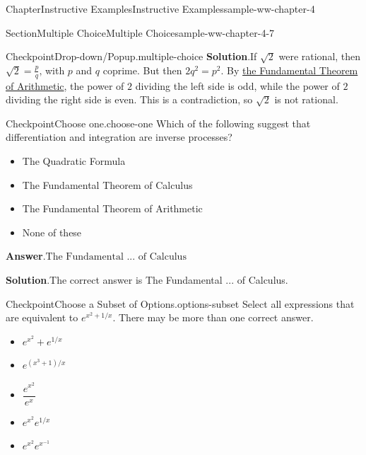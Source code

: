 \documentclass[oneside,10pt,]{book}
\newcommand{\blocktitlefont}{\relax}
\numberwithin{equation}{section}
\begin{document}
\begin{chapterptx}{Chapter}{Instructive Examples}{}{Instructive Examples}{}{}{sample-ww-chapter-4}
\begin{sectionptx}{Section}{Multiple Choice}{}{Multiple Choice}{}{}{sample-ww-chapter-4-7}
\begin{inlineexercise}{Checkpoint}{Drop-down\slash{}Popup.}{multiple-choice}
\noindent\textbf{\blocktitlefont Solution}.\hypertarget{multiple-choice-4}{}\quad{}If \(\sqrt{2}\) were rational, then \(\sqrt{2}=\frac{p}{q}\text{,}\) with \(p\) and \(q\) coprime. But then \(2q^2=p^2\text{.}\) By \href{https://en.wikipedia.org/wiki/Fundamental_theorem_of_arithmetic\#Canonical_representation_of_a_positive_integer}{the Fundamental Theorem of Arithmetic}\footnotemark{}, the power of \(2\) dividing the left side is odd, while the power of \(2\) dividing the right side is even. This is a contradiction, so \(\sqrt{2}\) is not rational.%
\end{inlineexercise}%
%
\begin{inlineexercise}{Checkpoint}{Choose one.}{choose-one}%
Which of the following suggest that differentiation and integration are inverse processes?%
\par
\begin{itemize}[label=$\bigcirc$,leftmargin=3em,]
\item{}The Quadratic Formula%
\item{}The Fundamental Theorem of Calculus%
\item{}The Fundamental Theorem of Arithmetic%
\item{}None of these%
\end{itemize}
%
\par\smallskip%
\noindent\textbf{\blocktitlefont Answer}.\hypertarget{choose-one-3}{}\quad{}\(\text{The Fundamental ... of Calculus}\)%
\par\smallskip%
\noindent\textbf{\blocktitlefont Solution}.\hypertarget{choose-one-4}{}\quad{}The correct answer is The Fundamental ... of Calculus.%
\end{inlineexercise}%
\begin{inlineexercise}{Checkpoint}{Choose a Subset of Options.}{options-subset}%
Select all expressions that are equivalent to \(e^{x^2 + 1/x}\text{.}\) There may be more than one correct answer.%
\par
%
\begin{itemize}[label=\textbullet]
\item{}\(\displaystyle e^{x^2} + e^{1/x}\)%
\item{}\(\displaystyle e^{ (x^3+1) / x}\)%
\item{}\(\displaystyle \dfrac{ e^{x^2} }{ e^x }\)%
\item{}\(\displaystyle e^{x^2} e^{1/x}\)%
\item{}\(\displaystyle e^{x^2} e^{x^{-1}}\)%

\end{itemize}
\end{inlineexercise}
\end{sectionptx}
\end{chapterptx}
\end{document}

